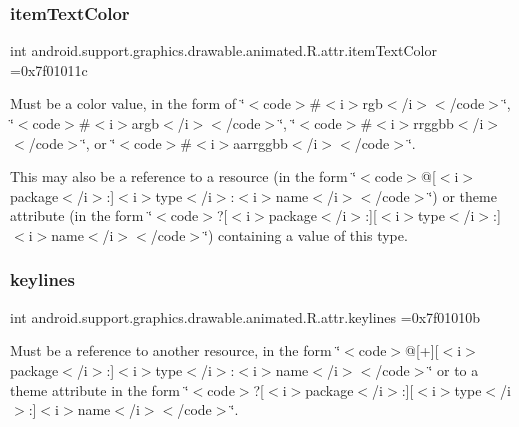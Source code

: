 \subsubsection{\texorpdfstring{item\+Text\+Color}{itemTextColor}}
{\footnotesize\ttfamily int android.\+support.\+graphics.\+drawable.\+animated.\+R.\+attr.\+item\+Text\+Color =0x7f01011c\hspace{0.3cm}{\ttfamily [static]}}

Must be a color value, in the form of \char`\"{}$<$code$>$\#$<$i$>$rgb$<$/i$>$$<$/code$>$\char`\"{}, \char`\"{}$<$code$>$\#$<$i$>$argb$<$/i$>$$<$/code$>$\char`\"{}, \char`\"{}$<$code$>$\#$<$i$>$rrggbb$<$/i$>$$<$/code$>$\char`\"{}, or \char`\"{}$<$code$>$\#$<$i$>$aarrggbb$<$/i$>$$<$/code$>$\char`\"{}. 

This may also be a reference to a resource (in the form \char`\"{}$<$code$>$@\mbox{[}$<$i$>$package$<$/i$>$\+:\mbox{]}$<$i$>$type$<$/i$>$\+:$<$i$>$name$<$/i$>$$<$/code$>$\char`\"{}) or theme attribute (in the form \char`\"{}$<$code$>$?\mbox{[}$<$i$>$package$<$/i$>$\+:\mbox{]}\mbox{[}$<$i$>$type$<$/i$>$\+:\mbox{]}$<$i$>$name$<$/i$>$$<$/code$>$\char`\"{}) containing a value of this type. \mbox{\label{classandroid_1_1support_1_1graphics_1_1drawable_1_1animated_1_1R_1_1attr_a6fb7aad32c038f97c48e870ca09e1d8f}} 
\subsubsection{\texorpdfstring{keylines}{keylines}}
{\footnotesize\ttfamily int android.\+support.\+graphics.\+drawable.\+animated.\+R.\+attr.\+keylines =0x7f01010b\hspace{0.3cm}{\ttfamily [static]}}

Must be a reference to another resource, in the form \char`\"{}$<$code$>$@\mbox{[}+\mbox{]}\mbox{[}$<$i$>$package$<$/i$>$\+:\mbox{]}$<$i$>$type$<$/i$>$\+:$<$i$>$name$<$/i$>$$<$/code$>$\char`\"{} or to a theme attribute in the form \char`\"{}$<$code$>$?\mbox{[}$<$i$>$package$<$/i$>$\+:\mbox{]}\mbox{[}$<$i$>$type$<$/i$>$\+:\mbox{]}$<$i$>$name$<$/i$>$$<$/code$>$\char`\"{}. \mbox{\label{classandroid_1_1support_1_1graphics_1_1drawable_1_1animated_1_1R_1_1attr_a79b5e399ed31f7092fb8da76cdc2423d}} 
